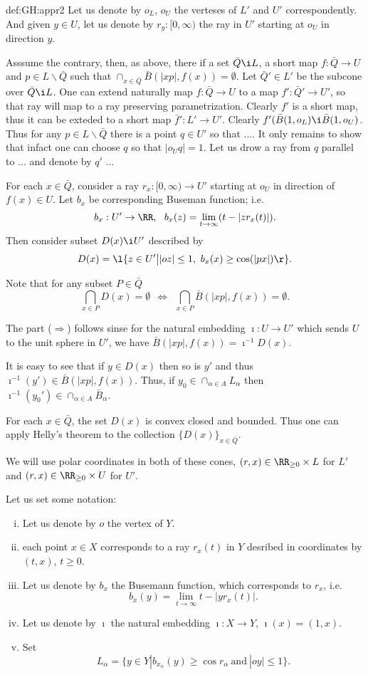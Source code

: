 {\begin{subthm}{def:GH:appr2}
Let us denote by $o_L$, $o_U$ the verteses of $L'$ and $U'$ correspondently.
And given $y\in U$, let us denote by $r_y:[0,\infty)$ the ray in $U'$ starting at $o_U$ in direction $y$.

Asssume the contrary, then, as above, 
there if a set $\bar Q\i L$, 
a short map $f:\bar Q\to U$ and  
$p\in L\backslash \bar Q$ such that 
$\cap_{x\in \bar Q}\bar B(|xp|,f(x))=\emptyset$.
Let $\bar Q'\in L'$ be the subcone over $\bar Q\i L$.
One can extend naturally map $f:\bar Q\to U$ to a map $f':\bar Q'\to U'$, so that ray will map to a ray preserving parametrization.
Clearly $f'$ is a short map, thus it can be exteded to a short map $\bar f':L'\to U'$.
Clearly $f'(\bar B(1,o_L)\i \bar B(1,o_U)$.
Thus for any $p\in L\backslash \bar Q$ there is a point $q\in U'$ 
so that $...$.
It only remains to show that infact one can choose $q$ so that $|o_Uq|=1$.
Let us drow a ray from $q$ parallel to ... and denote by $q'$ ...

For each $x\in \bar Q$, consider a ray $r_x:[0,\infty)\to U'$ starting at $o_U$ in direction of $f(x)\in U$.
Let $b_x$ be corresponding Buseman function; i.e.
$$b_x:U'\to\RR,\ \ b_x(z)=\lim_{t\to\infty}(t-|zr_x(t)|).$$
Then consider subset $D(x)\i U'$ described by
$$D(x)=\l\{z\in U'{\big\vert}|oz|\le 1,\ b_x(x)\ge \cos(|px|)\r\}.$$

Note that for any subset $P\in\bar Q$
$$\bigcap_{x\in P} D(x)=\emptyset 
\ \ 
\Longleftrightarrow
\ \ 
\bigcap_{x\in P} \bar B(|xp|,f(x))=\emptyset.$$

The part ($\Rightarrow$) follows sinse for the natural embedding $\imath:U\to U'$ which sends $U$ to the unit sphere in $U'$, we have $\bar B(|xp|,f(x))=\imath^{-1}D(x)$.
 

It is easy to see that if $y\in D(x)$ then so is
$y'$ and thus $\imath^{-1}(y')\in \bar B(|xp|,f(x))$.
Thus, if $y_0\in \cap_{\alpha\in A} L_\alpha$ then 
$\imath^{-1}(y_0')\in \cap_{\alpha\in A} \bar B_\alpha$.

For each $x\in \bar Q$, the set $D(x)$ is convex closed and bounded. 
Thus one can apply Helly's theorem to the collection $\{D(x)\}_{x\in \bar Q}$.

We will use polar coordinates in both of these cones,
$(r,x)\in\RR_{\ge0}\times L$ for $L'$ and 
$(r,x)\in\RR_{\ge0}\times U$ for $U'$.

 
Let us set some notation:
\begin{enumerate}[(i)]
\item Let us denote by $o$ the vertex of $Y$.
\item each point $x\in X$ corresponds to a ray
$r_x(t)$ in $Y$ desribed in coordinates by $(t,x)$, $t\ge 0$.
\item Let us denote by $b_x$ the Busemann function, which corresponds to $r_x$, i.e.
$$b_x(y)=\lim_{t\to\infty}t-|yr_x(t)|.$$
\item Let us denote by $\imath$ the natural embedding $\imath:X\to Y$, 
$\imath(x)=(1,x)$.
\item Set
$$L_\alpha=\{y\in Y|b_{x_\alpha}(y)\ge \cos r_\alpha\ \text{and}\  |oy|\le 1\}.$$
\end{enumerate} 


\end{subthm}}

